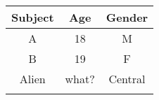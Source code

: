 \documentclass{article}
\begin{document}
\begin{tabular}{|c|c|c|}
\hline
Subject	&	Age	&	Gender\\
\hline %
A		&	18		&	M\\
B		&	19		&	F\\
Alien		&	what?	&	Central\\
&&\\
\hline
\end{tabular}
\end{document}
